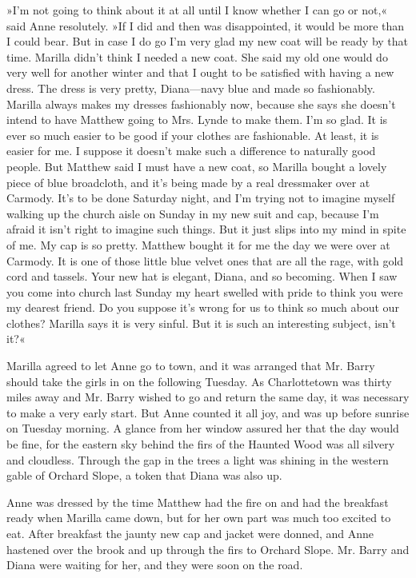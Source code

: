 »I’m not going to think about it at all until I know whether I can go or not,« said Anne resolutely. »If I did and then was disappointed, it would be more than I could bear. But in case I do go I’m very glad my new coat will be ready by that time. Marilla didn’t think I needed a new coat. She said my old one would do very well for another winter and that I ought to be satisfied with having a new dress. The dress is very pretty, Diana—navy blue and made so fashionably. Marilla always makes my dresses fashionably now, because she says she doesn’t intend to have Matthew going to Mrs. Lynde to make them. I’m so glad. It is ever so much easier to be good if your clothes are fashionable. At least, it is easier for me. I suppose it doesn’t make such a difference to naturally good people. But Matthew said I must have a new coat, so Marilla bought a lovely piece of blue broadcloth, and it’s being made by a real dressmaker over at Carmody. It’s to be done Saturday night, and I’m trying not to imagine myself walking up the church aisle on Sunday in my new suit and cap, because I’m afraid it isn’t right to imagine such things. But it just slips into my mind in spite of me. My cap is so pretty. Matthew bought it for me the day we were over at Carmody. It is one of those little blue velvet ones that are all the rage, with gold cord and tassels. Your new hat is elegant, Diana, and so becoming. When I saw you come into church last Sunday my heart swelled with pride to think you were my dearest friend. Do you suppose it’s wrong for us to think so much about our clothes? Marilla says it is very sinful. But it is such an interesting subject, isn’t it?«

Marilla agreed to let Anne go to town, and it was arranged that Mr. Barry should take the girls in on the following Tuesday. As Charlottetown was thirty miles away and Mr. Barry wished to go and return the same day, it was necessary to make a very early start. But Anne counted it all joy, and was up before sunrise on Tuesday morning. A glance from her window assured her that the day would be fine, for the eastern sky behind the firs of the Haunted Wood was all silvery and cloudless. Through the gap in the trees a light was shining in the western gable of Orchard Slope, a token that Diana was also up.

Anne was dressed by the time Matthew had the fire on and had the breakfast ready when Marilla came down, but for her own part was much too excited to eat. After breakfast the jaunty new cap and jacket were donned, and Anne hastened over the brook and up through the firs to Orchard Slope. Mr. Barry and Diana were waiting for her, and they were soon on the road.

